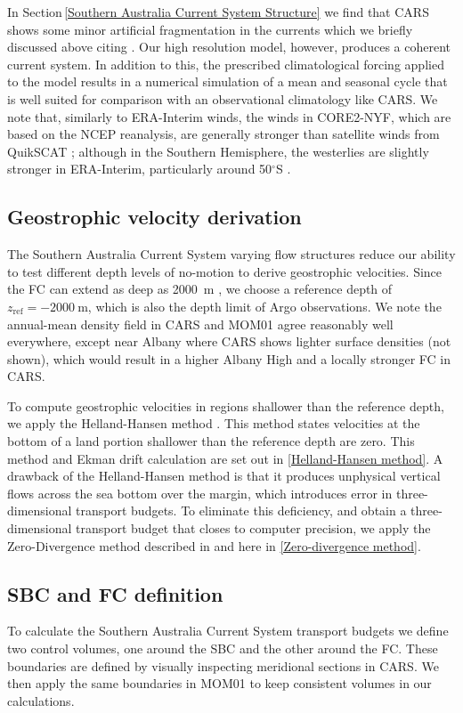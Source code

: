 \documentclass[preprint,3p,review,12pt]{elsarticle}
\newcommand{\dg}{$^{\circ}$}
\newcommand{\sub}[1]{_{\text{#1}}}
\begin{document}
In Section\,\ref{Southern Australia Current System Structure} we find that CARS shows some minor artificial fragmentation in the currents which we briefly discussed above citing \citet{Ridgway2002}. Our high resolution model, however, produces a coherent current system. In addition to this, the prescribed climatological forcing applied to the model results in a numerical simulation of a mean and seasonal cycle that is well suited for comparison with an observational climatology like CARS.
We note that, similarly to ERA-Interim winds, the winds in CORE2-NYF, which are based on the NCEP reanalysis, are generally stronger than satellite winds from QuikSCAT \citep{Large2009}; although in the Southern Hemisphere, the westerlies are slightly stronger in ERA-Interim, particularly around 50\dg S \citep{Chaudhuri2013}.

\subsection{Geostrophic velocity derivation} \label{Geostrophic velocity derivation}
The Southern Australia Current System varying flow structures reduce our ability to test different depth levels of no-motion to derive geostrophic velocities. Since the FC can extend as deep as \SI{2000}{\meter} \citep{Middleton2002}, we choose a reference depth of $z\sub{ref} = \SI{-2000}{\meter}$, which is also the depth limit of Argo observations. We note the annual-mean density field in CARS and MOM01 agree reasonably well everywhere, except near Albany where CARS shows lighter surface densities (not shown), which would result in a higher Albany High and a locally stronger FC in CARS.

To compute geostrophic velocities in regions shallower than the reference depth, we apply the Helland-Hansen method \citep{Helland-Hansen1934,Fomin1964}. This method states velocities at the bottom of a land portion shallower than the reference depth are zero. This method and Ekman drift calculation are set out in \ref{Helland-Hansen method}. A drawback of the Helland-Hansen method is that it produces unphysical vertical flows across the sea bottom over the margin, which introduces error in three-dimensional transport budgets. To eliminate this deficiency, and obtain a three-dimensional transport budget that closes to computer precision, we apply the Zero-Divergence method described in \citet{Furue2017} and here in \ref{Zero-divergence method}.

\subsection{SBC and FC definition} \label{SBC and FC definition}
To calculate the Southern Australia Current System transport budgets we define two control volumes, one around the SBC and the other around the FC\@. These boundaries are defined by visually inspecting meridional sections in CARS. We then apply the same boundaries in MOM01 to keep consistent volumes in our calculations. 
\end{document}
